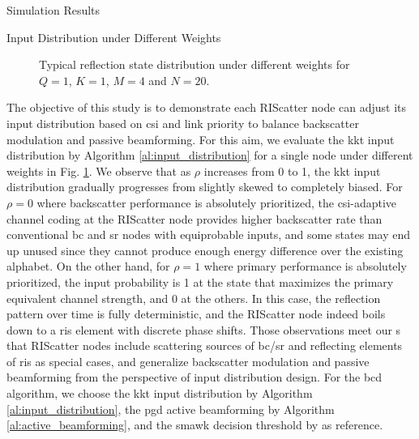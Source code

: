 \documentclass[journal]{IEEEtran}
\begin{document}
\begin{section}{Simulation Results}
	\begin{subsection}{Input Distribution under Different Weights}
		\begin{figure}[!t]
			\centering
			\resizebox{0.65\columnwidth}{!}{
				
			}
			\caption{Typical reflection state distribution under different weights for $Q=1$, $K=1$, $M=4$ and $N=20$.}
			\label{fg:distribution_weights}
		\end{figure}
		The objective of this study is to demonstrate each RIScatter node can adjust its input distribution based on \gls{csi} and link priority to balance backscatter modulation and passive beamforming.
		For this aim, we evaluate the \gls{kkt} input distribution by Algorithm \ref{al:input_distribution} for a single node under different weights in Fig. \ref{fg:distribution_weights}.
		We observe that as $\rho$ increases from \num{0} to \num{1}, the \gls{kkt} input distribution
		gradually progresses from slightly skewed to completely biased.
		For $\rho=0$ where backscatter performance is absolutely prioritized, the \gls{csi}-adaptive channel coding at the RIScatter node provides higher backscatter rate than conventional \gls{bc} and \gls{sr} nodes with equiprobable inputs, and some states may end up unused since they cannot produce enough energy difference over the existing alphabet.
		On the other hand, for $\rho=1$ where primary performance is absolutely prioritized, the input probability is \num{1} at the state that maximizes the primary equivalent channel strength, and \num{0} at the others.
		In this case, the reflection pattern over time is fully deterministic, and the RIScatter node indeed boils down to a \gls{ris} element with discrete phase shifts.
		Those observations meet our s that RIScatter nodes include scattering sources of \gls{bc}/\gls{sr} and reflecting elements of \gls{ris} as special cases, and generalize backscatter modulation and passive beamforming from the perspective of input distribution design.
		For the \gls{bcd} algorithm, we choose the \gls{kkt} input distribution by Algorithm \ref{al:input_distribution}, the \gls{pgd} active beamforming by Algorithm \ref{al:active_beamforming}, and the \gls{smawk} decision threshold by \cite{He2021} as reference.
	\end{subsection}


\end{section}
\end{document}
